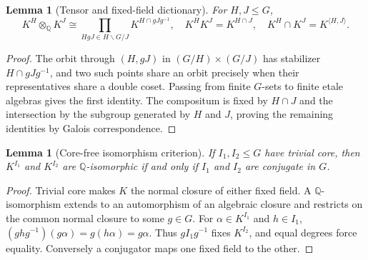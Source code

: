 \documentclass[11pt]{article}
\newtheorem{lemma}[theorem]{Lemma}
\newcommand{\Q}{\mathbb Q}
\begin{document}
\begin{lemma}[Tensor and fixed-field dictionary]\label{lem:dictionary}
For $H,J\leq G$,
\[
K^H\otimes_\Q K^J\cong\prod_{HgJ\in H\backslash G/J}K^{H\cap gJg^{-1}},
\quad K^HK^J=K^{H\cap J},\quad K^H\cap K^J=K^{\langle H,J\rangle}.
\]
\end{lemma}
\begin{proof}
The orbit through $(H,gJ)$ in $(G/H)\times(G/J)$ has stabilizer
$H\cap gJg^{-1}$, and two such points share an orbit precisely when their representatives
share a double coset.  Passing from finite $G$-sets to finite etale algebras gives the first
identity.  The compositum is fixed by $H\cap J$ and the intersection by the subgroup generated
by $H$ and $J$, proving the remaining identities by Galois correspondence.
\end{proof}

\begin{lemma}[Core-free isomorphism criterion]\label{lem:corefree}
If $I_1,I_2\leq G$ have trivial core, then $K^{I_1}$ and $K^{I_2}$ are
$\Q$-isomorphic if and only if $I_1$ and $I_2$ are conjugate in $G$.
\end{lemma}
\begin{proof}
Trivial core makes $K$ the normal closure of either fixed field.  A $\Q$-isomorphism extends
to an automorphism of an algebraic closure and restricts on the common normal closure to some
$g\in G$.  For $\alpha\in K^{I_1}$ and $h\in I_1$,
$(ghg^{-1})(g\alpha)=g(h\alpha)=g\alpha$.  Thus $gI_1g^{-1}$ fixes $K^{I_2}$,
and equal degrees force equality.  Conversely a conjugator maps one fixed field to the other.
\end{proof}
\end{document}
